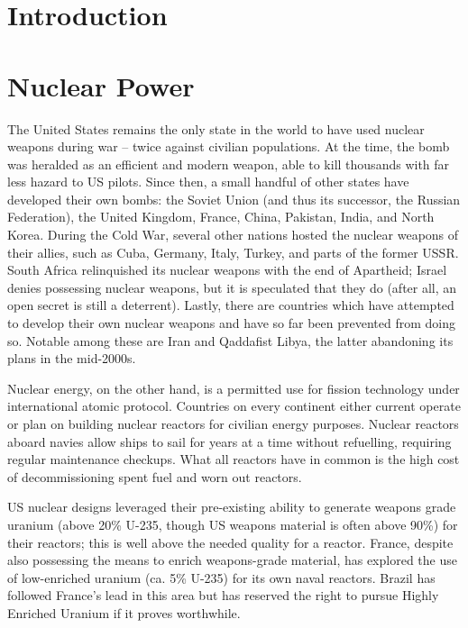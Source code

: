 \documentclass[letterpaper,12pt,twoside]{article} %
\begin{document}
\begin{multicols}{2}

\section*{Introduction}

\section{Nuclear Power}

The United States remains the only state in the world to have used nuclear weapons during war -- twice against civilian populations. At the time, the bomb was heralded as an efficient and modern weapon, able to kill thousands with far less hazard to US pilots. Since then, a small handful of other states have developed their own bombs: the Soviet Union (and thus its successor, the Russian Federation), the United Kingdom, France, China, Pakistan, India, and North Korea. During the Cold War, several other nations hosted the nuclear weapons of their allies, such as Cuba, Germany, Italy, Turkey, and parts of the former USSR. South Africa relinquished its nuclear weapons with the end of Apartheid; Israel denies possessing nuclear weapons, but it is speculated that they do (after all, an open secret is still a deterrent).  Lastly, there are countries which have attempted to develop their own nuclear weapons and have so far been prevented from doing so. Notable among these are Iran and Qaddafist Libya, the latter abandoning its plans in the mid-2000s.

Nuclear energy, on the other hand, is a permitted use for fission technology under international atomic protocol. Countries on every continent either current operate or plan on building nuclear reactors for civilian energy purposes. Nuclear reactors aboard navies allow ships to sail for years at a time without refuelling, requiring regular maintenance checkups. What all reactors have in common is the high cost of decommissioning spent fuel and worn out reactors.

US nuclear designs leveraged their pre-existing ability to generate weapons grade uranium (above 20\% U-235, though US weapons material is often above 90\%) for their reactors; this is well above the needed quality for a reactor. France, despite also possessing the means to enrich weapons-grade material, has explored the use of low-enriched uranium (ca. 5\% U-235) for its own naval reactors. Brazil has followed France's lead in this area but has reserved the right to pursue Highly Enriched Uranium if it proves worthwhile.


\end{multicols}
\end{document}

